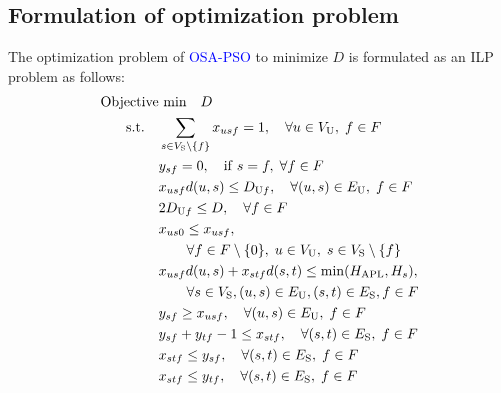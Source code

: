 \documentclass[10pt, letterpaper]{IEEEtran}
\newcommand\blue[1]{\textcolor{blue}{#1}}
\begin{document}
\begin{CJK}{UTF8}{ipxm}
\subsection{Formulation of optimization problem}
The optimization problem of \blue{OSA-PSO} to minimize $D$ is formulated as an ILP problem as follows:
\blue{
\begin{subequations} \label{OSA-PSO}
  \begin{align}
  \text{Objective}&\text{ min}\quad D \label{OSA-PSO a} \\
  \rm{s.t.} \quad
  &\sum_{s \in V_{\rm{S}} \setminus \{f\}} x_{usf} = 1, \quad \forall u \in V_{\rm{U}}, \; f \in F \label{OSA-PSO b} \\
  &y_{sf} = 0, \quad \mathrm{if} \; s = f, \; \forall f \in F \label{OSA-PSO c} \\  %
  &x_{usf}d(u,s) \le D_{\mathrm{U}f}, \quad \forall (u,s) \in E_{\rm{U}}, \; f \in F \label{OSA-PSO d} \\
  &2D_{\mathrm{U}f} \le D, \quad \forall f \in F \label{OSA-PSO e} \\
  &x_{us0} \le x_{usf}, \notag \\
  &\qquad \forall f \in F \setminus \{0\}, \; u \in V_{\rm{U}}, \; s \in V_{\rm{S}} \setminus \{f\} \label{OSA-PSO f} \\
  &x_{usf}d(u,s) + x_{stf}d(s,t) \le \min(H_{\rm APL},H_s), \notag \\
  &\qquad \forall s \in V_{\rm{S}}, (u,s) \in E_{\rm{U}}, (s,t) \in E_{\rm{S}}, f \in F \label{OSA-PSO g} \\
  &y_{sf} \geq x_{usf}, \quad \forall (u,s) \in E_{\rm{U}}, \; f \in F \label{OSA-PSO h} \\
  &y_{sf} + y_{tf} - 1 \le x_{stf}, \quad \forall (s,t) \in E_{\rm{S}}, \; f \in F \label{OSA-PSO i} \\
  &x_{stf} \le y_{sf}, \quad \forall (s,t) \in E_{\rm{S}}, \; f \in F \label{OSA-PSO j} \\
  &x_{stf} \le y_{tf}, \quad \forall (s,t) \in E_{\rm{S}}, \; f \in F \label{OSA-PSO k} \\

\end{align}
\end{subequations}}
\end{CJK}
\end{document}
